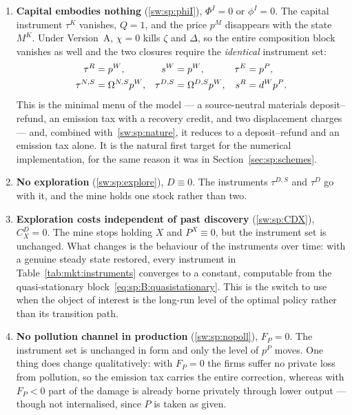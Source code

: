 \begin{enumerate}[label=\textbf{(W\arabic*)},ref=W\arabic*,leftmargin=3.2em,itemsep=0.35em]
\item \textbf{Capital embodies nothing} (\ref{sw:sp:phiI}), $\Phi^I=0$ or $\phi^I=0$. The capital
instrument $\tau^K$ vanishes, $Q=1$, and the price $p^M$ disappears with the state $M^K$. Under
Version~A, $\chi=0$ kills $\zeta$ and $\Delta$, so the entire composition block vanishes as well and
the two closures require the \emph{identical} instrument set:
\begin{align}
\tau^R &= p^W,
&
s^W &= p^W,
&
\tau^E &= p^P,
\notag\\
\tau^{N,S} &= \Omega^{N,S}p^W,
&
\tau^{D,S} &= \Omega^{D,S}p^W,
&
s^R &= d^Wp^P .
\label{eq:mkt:schemes:minimal}
\end{align}
This is the minimal menu of the model --- a source-neutral materials deposit--refund, an emission tax
with a recovery credit, and two displacement charges --- and, combined with~\ref{sw:sp:nature}, it
reduces to a deposit--refund and an emission tax alone. It is the natural first target for the
numerical implementation, for the same reason it was in Section~\ref{sec:sp:schemes}.

\item \textbf{No exploration} (\ref{sw:sp:explore}), $D\equiv0$. The instruments $\tau^{D,S}$ and
$\tau^D$ go with it, and the mine holds one stock rather than two.

\item \textbf{Exploration costs independent of past discovery} (\ref{sw:sp:CDX}), $C^D_X=0$. The mine
stops holding $X$ and $P^X\equiv0$, but the instrument set is unchanged. What changes is the behaviour
of the instruments over time: with a genuine steady state restored, every instrument in
Table~\ref{tab:mkt:instruments} converges to a constant, computable from the quasi-stationary
block~\eqref{eq:sp:B:quasistationary}. This is the switch to use when the object of interest is the
long-run level of the optimal policy rather than its transition path.

\item \textbf{No pollution channel in production} (\ref{sw:sp:nopoll}), $F_P=0$. The instrument set is
unchanged in form and only the level of $p^P$ moves. One thing does change qualitatively: with $F_P=0$
the firms suffer no private loss from pollution, so the emission tax carries the entire correction,
whereas with $F_P<0$ part of the damage is already borne privately through lower output --- though not
internalised, since $P$ is taken as given.

\end{enumerate}

